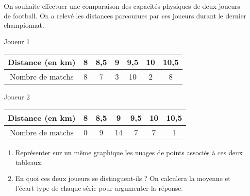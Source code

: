 
On souhaite effectuer une comparaison des capacités physiques de deux joueurs de football. On a relevé les
distances parcourues par ces joueurs durant le dernier championnat.

Joueur 1

\begin{tabular}{|c|c|c|c|c|c|c|}
\hline 
Distance (en km) & 8 & 8,5 & 9 & 9,5 & 10 & 10,5 \\ 
\hline 
Nombre de matchs & 8 & 7 & 3 & 10 & 2& 8\\ 
\hline 
\end{tabular} 

Joueur 2

\begin{tabular}{|c|c|c|c|c|c|c|}
\hline 
Distance (en km)& 8& 8,5& 9 &9,5& 10 & 10,5\\
\hline 
Nombre de matchs&0& 9 &14& 7 &7& 1\\
\hline 
\end{tabular}

\begin{enumerate}
\item Représenter sur un même graphique les nuages de points associés à ces deux tableaux.
\item En quoi ces deux joueurs se distinguent-ils ? On calculera la moyenne et l'écart type de chaque série pour argumenter la réponse.
\end{enumerate}